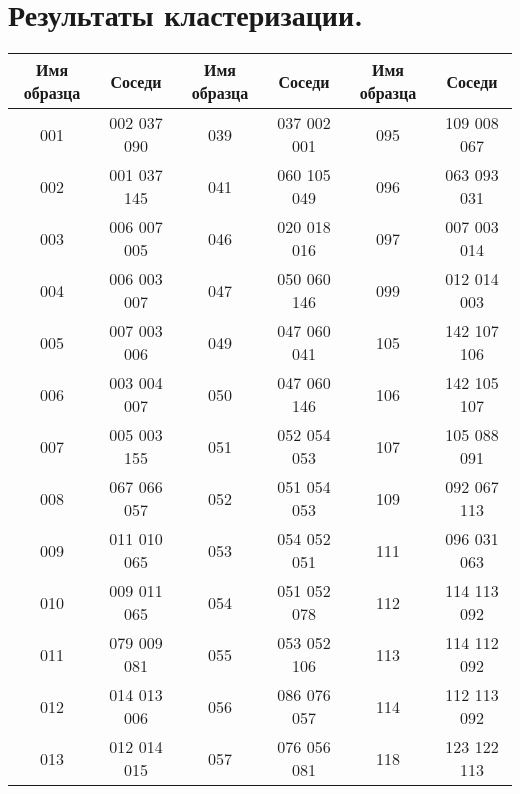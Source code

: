 \documentclass[12pt,fleqn]{article}
\begin{document}
\section{Результаты кластеризации.}
\begin{table}[h]
\begin{center}
\begin{tabular}{|c|c|c|c|c|c|}
\hline
Имя образца & Соседи & Имя образца & Соседи & Имя образца & Соседи \\ \hline
         001 &            002 037 090  &         039 &            037 002 001  &         095 &            109 008 067  \\ 
         002 &            001 037 145  &         041 &            060 105 049  &         096 &            063 093 031  \\
        003 &            006 007 005  &         046 &            020 018 016  &         097 &            007 003 014  \\
        004 &            006 003 007  &         047 &            050 060 146  &         099 &            012 014 003  \\
         005 &            007 003 006  &         049 &            047 060 041  &         105 &            142 107 106  \\
        006 &            003 004 007  &         050 &            047 060 146  &         106 &            142 105 107  \\
         007 &            005 003 155  &         051 &            052 054 053  &         107 &            105 088 091  \\
        008 &            067 066 057  &         052 &            051 054 053  &         109 &            092 067 113  \\
         009 &            011 010 065  &         053 &            054 052 051  &         111 &            096 031 063  \\
        010 &            009 011 065  &         054 &            051 052 078  &         112 &            114 113 092  \\
         011 &            079 009 081  &         055 &            053 052 106  &         113 &            114 112 092  \\
         012 &            014 013 006  &         056 &            086 076 057  &         114 &            112 113 092  \\
         013 &            012 014 015  &         057 &            076 056 081  &         118 &            123 122 113  \\

\end{tabular}
\end{center}
\end{table}
\end{document}

